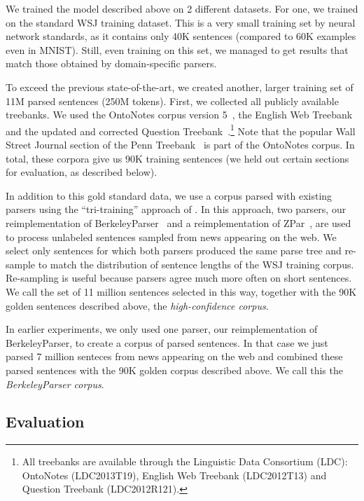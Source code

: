 \documentclass{article} \usepackage{nips15submit_e,times}
\newcommand\citep\cite
\begin{document}
We trained the model described above on 2 different datasets.
For one, we trained on the standard WSJ training dataset.
This is a very small training set by neural network standards, as it contains
only 40K sentences (compared to 60K examples even in MNIST).
Still, even training on this set, we managed to get results that
match those obtained by domain-specific parsers.

To exceed the previous state-of-the-art, we created another, larger training
set of 11M parsed sentences (250M tokens). First, we collected all
publicly available treebanks.
We used the OntoNotes corpus version 5~\citep{hovy-EtAl:2006:NAACL},
the English Web Treebank~\citep{petrov-mcdonald:2012:SANCL} and the updated
and corrected Question Treebank~\citep{judge-etAl:2006:ACL}.\footnote{All
treebanks are available through the Linguistic Data Consortium
(LDC): OntoNotes (LDC2013T19), English Web Treebank (LDC2012T13) and
Question Treebank (LDC2012R121).}
Note that the popular Wall Street Journal section of the Penn
Treebank~\citep{marcus:1993:CL} is part of the OntoNotes corpus.
In total, these corpora give us 90K training sentences (we held out
certain sections for evaluation, as described below).

In addition to this gold standard data, we use a corpus parsed with existing
parsers using the ``tri-training'' approach of \cite{Li0C14}. In this approach,
two parsers, our reimplementation of BerkeleyParser~\cite{petrov-EtAl:2006:ACL}
and a reimplementation of ZPar~\cite{zhu-EtAl:2013:ACL}, are used to process
unlabeled sentences sampled from news appearing on the web. We select only
sentences for which both parsers produced the same parse tree and re-sample
to match the distribution of sentence lengths of the WSJ training corpus.
Re-sampling is useful because parsers agree much more often on short sentences.
We call the set of 11 million sentences selected in this way,
together with the 90K golden sentences described above,
the \emph{high-confidence corpus}.

In earlier experiments, we only used one parser, our reimplementation of BerkeleyParser,
to create a corpus of parsed sentences. In that case we just parsed 7 million
senteces from news appearing on the web and combined these parsed sentences with the
90K golden corpus described above. We call this the \emph{BerkeleyParser corpus}.

\subsection{Evaluation}
\end{document}
